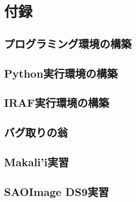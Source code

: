 \chapter*{付録}
\label{chap:appendix}

\setcounter{section}{0} %
\renewcommand{\thesection}{\Alph{section}} %
\setcounter{equation}{0} %
\renewcommand{\theequation}{\Alph{section}.\arabic{equation}}
\setcounter{figure}{0} %
\renewcommand{\thefigure}{\Alph{section}.\arabic{figure}}
\setcounter{table}{0} %
\renewcommand{\thetable}{\Alph{section}.\arabic{table}}

\section{プログラミング環境の構築}


\section{Python実行環境の構築}

\section{IRAF実行環境の構築}

\section{バグ取りの翁}

\section{Makali'i実習}

\section{SAOImage DS9実習}